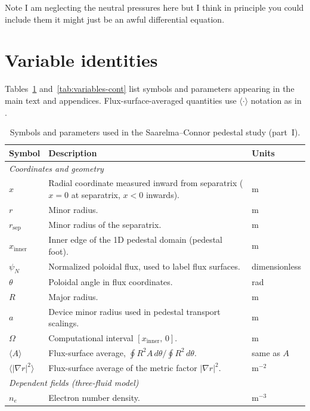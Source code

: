\documentclass[twocolumn,secnumarabic,amssymb, nobibnotes, aps, prd]{revtex4-2}
\begin{document}
Note I am neglecting the neutral pressures here but I think in principle you could include them it might just be an awful differential equation.

\section{Variable identities}
\label{app:Variables}

Tables~\ref{tab:variables} and~\ref{tab:variables-cont} list symbols and parameters appearing in the main text and appendices.
Flux-surface-averaged quantities use $\langle\cdot\rangle$ notation as in \cite{saarelma2023testing}.

\begin{table}[t]
\caption{\label{tab:variables}Symbols and parameters used in the Saarelma--Connor pedestal study (part~I).}
\begin{ruledtabular}
\begin{tabular}{lll}
Symbol & Description & Units \\
\hline
\multicolumn{3}{l}{\textit{Coordinates and geometry}} \\
$x$ & Radial coordinate measured inward from separatrix ($x=0$ at separatrix, $x<0$ inwards). & m \\
$r$ & Minor radius. & m \\
$r_{\mathrm{sep}}$ & Minor radius of the separatrix. & m \\
$x_{\mathrm{inner}}$ & Inner edge of the 1D pedestal domain (pedestal foot). & m \\
$\psi_N$ & Normalized poloidal flux, used to label flux surfaces. & dimensionless \\
$\theta$ & Poloidal angle in flux coordinates. & rad \\
$R$ & Major radius. & m \\
$a$ & Device minor radius used in pedestal transport scalings. & m \\
$\Omega$ & Computational interval $[x_{\mathrm{inner}},\,0]$. & m \\
$\langle A\rangle$ & Flux-surface average, $\oint R^2 A\,d\theta / \oint R^2\,d\theta$. & same as $A$ \\
$\langle|\nabla r|^2\rangle$ & Flux-surface average of the metric factor $|\nabla r|^2$. & m$^{-2}$ \\
\hline
\multicolumn{3}{l}{\textit{Dependent fields (three-fluid model)}} \\
$n_e$ & Electron number density. & m$^{-3}$ \\

\end{tabular}
\end{ruledtabular}
\end{table}
\end{document}

